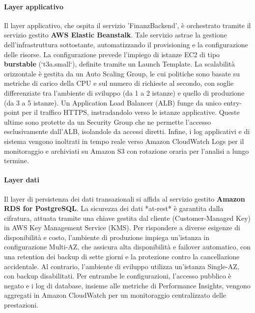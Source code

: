 \paragraph{Layer applicativo}
Il layer applicativo, che ospita il servizio 'Finanz\discretionary{-}{}{-}Backend', è orchestrato tramite il servizio gestito \allowbreak{}\textbf{AWS \allowbreak{}Elastic \allowbreak{}Beanstalk}.
Tale servizio astrae la gestione dell'infrastruttura sottostante, automatizzando il provisioning e la configurazione delle risorse.
La configurazione prevede l'impiego di istanze EC2 di tipo \textbf{burstable} (`t3a.small`), definite tramite un Launch Template.
La scalabilità orizzontale è gestita da un Auto Scaling Group, le cui politiche sono basate su metriche di carico della CPU e sul numero di richieste al secondo, con soglie differenziate tra l'ambiente di sviluppo (da 1 a 2 istanze) e quello di produzione (da 3 a 5 istanze).
Un Application Load Balancer (ALB) funge da unico entry-point per il traffico HTTPS, instradandolo verso le istanze applicative.
Queste ultime sono protette da un Security Group che ne permette l'accesso esclusivamente dall'ALB, isolandole da accessi diretti.
Infine, i log applicativi e di sistema vengono inoltrati in tempo reale verso Amazon CloudWatch Logs per il monitoraggio e archiviati su Amazon S3 con rotazione oraria per l'analisi a lungo termine.

\paragraph{Layer dati}
Il layer di persistenza dei dati transazionali si affida al servizio gestito \textbf{Amazon RDS for PostgreSQL}. La sicurezza dei dati *at-rest* è garantita dalla cifratura, attuata tramite una chiave gestita dal cliente (Customer-Managed Key) in AWS Key Management Service (KMS). Per rispondere a diverse esigenze di disponibilità e costo, l'ambiente di produzione impiega un'istanza in configurazione Multi-AZ, che assicura alta disponibilità e failover automatico, con una retention dei backup di sette giorni e la protezione contro la cancellazione accidentale. Al contrario, l'ambiente di sviluppo utilizza un'istanza Single-AZ, con backup disabilitati. Per entrambe le configurazioni, l'accesso pubblico è negato e i log di database, insieme alle metriche di Performance Insights, vengono aggregati in Amazon CloudWatch per un monitoraggio centralizzato delle prestazioni.

